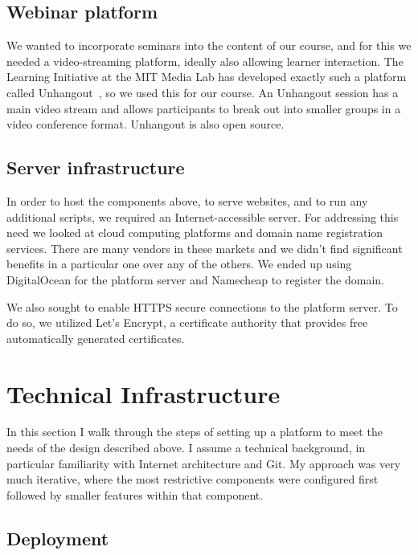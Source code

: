 \documentclass[12pt,twoside,vi]{mitthesis}
\newcommand{\draft}[1]{{\color{blue} #1}}
\begin{document}
\draft{

\subsection{Webinar platform}

We wanted to incorporate seminars into the content of our course, and for this we needed a video-streaming platform, ideally also allowing learner interaction. The Learning Initiative at the MIT Media Lab has developed exactly such a platform called Unhangout~\cite{unhangout}, so we used this for our course. An Unhangout session has a main video stream and allows participants to break out into smaller groups in a video conference format. Unhangout is also open source.

\subsection{Server infrastructure}

In order to host the components above, to serve websites, and to run any additional scripts, we required an Internet-accessible server. For addressing this need we looked at cloud computing platforms and domain name registration services. There are many vendors in these markets and we didn't find significant benefits in a particular one over any of the others. We ended up using DigitalOcean for the platform server and Namecheap to register the domain.

We also sought to enable HTTPS secure connections to the platform server. To do so, we utilized Let's Encrypt, a certificate authority that provides free automatically generated certificates.

\section{Technical Infrastructure}

In this section I walk through the steps of setting up a platform to meet the needs of the design described above. I assume a technical background, in particular familiarity with Internet architecture and Git. My approach was very much iterative, where the most restrictive components were configured first followed by smaller features within that component.

\subsection{Deployment}

}
\end{document}
